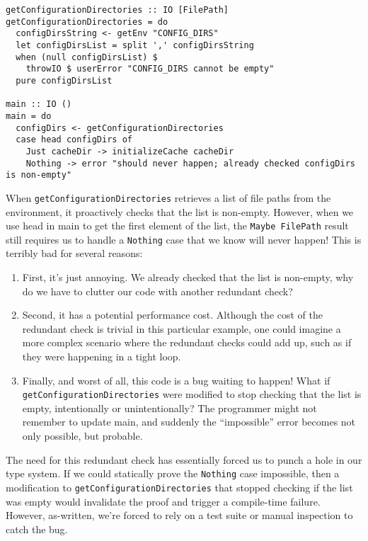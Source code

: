 \begin{verbatim}
getConfigurationDirectories :: IO [FilePath]
getConfigurationDirectories = do
  configDirsString <- getEnv "CONFIG_DIRS"
  let configDirsList = split ',' configDirsString
  when (null configDirsList) $
    throwIO $ userError "CONFIG_DIRS cannot be empty"
  pure configDirsList

main :: IO ()
main = do
  configDirs <- getConfigurationDirectories
  case head configDirs of
    Just cacheDir -> initializeCache cacheDir
    Nothing -> error "should never happen; already checked configDirs is non-empty"
\end{verbatim}
When \texttt{getConfigurationDirectories} retrieves a list of file paths from the environment, it proactively checks that the list is non-empty. However, when we use head in main to get the first element of the list, the \texttt{Maybe FilePath} result still requires us to handle a \texttt{Nothing} case that we know will never happen! This is terribly bad for several reasons:

\begin{enumerate}
\item First, it's just annoying. We already checked that the list is non-empty, why do we have to clutter our code with another redundant check?

\item Second, it has a potential performance cost. Although the cost of the redundant check is trivial in this particular example, one could imagine a more complex scenario where the redundant checks could add up, such as if they were happening in a tight loop.

\item Finally, and worst of all, this code is a bug waiting to happen! What if \texttt{get\-Configuration\-Directories} were modified to stop checking that the list is empty, intentionally or unintentionally? The programmer might not remember to update main, and suddenly the ``impossible'' error becomes not only possible, but probable.                                                                                                                                                                                                                                                                                                                            \end{enumerate}


The need for this redundant check has essentially forced us to punch a hole in our type system. If we could statically prove the \texttt{Nothing} case impossible, then a modification to \texttt{getConfigurationDirectories} that stopped checking if the list was empty would invalidate the proof and trigger a compile-time failure. However, as-written, we're forced to rely on a test suite or manual inspection to catch the bug.


